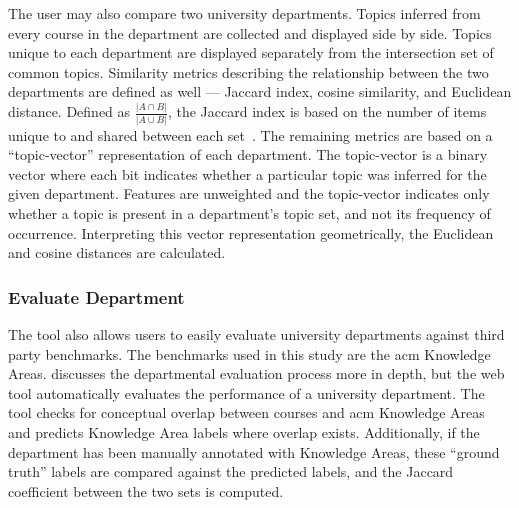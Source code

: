 The user may also compare two university departments.
Topics inferred from every course in the department are collected and displayed side by side.
Topics unique to each department are displayed separately from the intersection set of common topics.
Similarity metrics describing the relationship between the two departments are defined as well --- Jaccard index, cosine similarity, and Euclidean distance.
Defined as $\frac{\left| A \cap B\right|}{\left| A \cup B\right|}$, the Jaccard index is based on the number of items unique to and shared between each set~\cite{jaccard1912}.
The remaining metrics are based on a ``topic-vector'' representation of each department.
The topic-vector is a binary vector where each bit indicates whether a particular topic was inferred for the given department.
Features are unweighted and the topic-vector indicates only whether a topic is present in a department's topic set, and not its frequency of occurrence.
Interpreting this vector representation geometrically, the Euclidean and cosine distances are calculated.


\subsubsection{Evaluate Department}
\label{sec:vis-evaluate}


The tool also allows users to easily evaluate university departments against third party benchmarks.
The benchmarks used in this study are the \ac{acm} Knowledge Areas.
 discusses the departmental evaluation process more in depth, but the web tool automatically evaluates the performance of a university department.
The tool checks for conceptual overlap between courses and \ac{acm} Knowledge Areas and predicts Knowledge Area labels where overlap exists.
Additionally, if the department has been manually annotated with Knowledge Areas, these ``ground truth'' labels are compared against the predicted labels, and the Jaccard coefficient between the two sets is computed.

